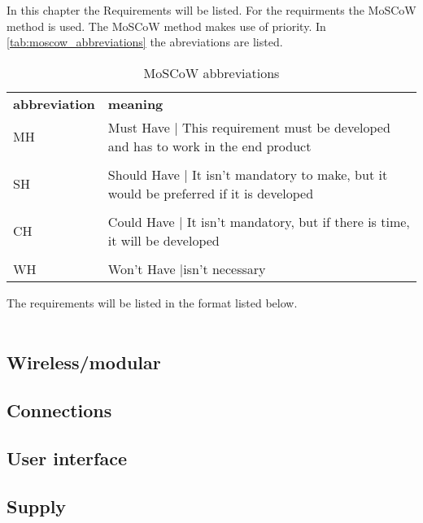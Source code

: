 In this chapter the Requirements will be listed. For the requirments the MoSCoW method is used. The MoSCoW method makes use of priority. In \autoref{tab:moscow_abbreviations} the abreviations are listed.

\begin{table}[H]
\centering
    \begin{tabular}{l p{8cm}}
        \textbf{abbreviation} & \textbf{meaning} \\
        MH & Must Have | This requirement must be developed and has to work in the end product\\
        & \\
        SH & Should Have | It isn't mandatory to make, but it would be preferred if it is developed\\
        & \\
        CH & Could Have | It isn't mandatory, but if there is time, it will be developed\\
        & \\
        WH & Won't Have |isn't necessary\\
    \end{tabular}
    \caption{MoSCoW abbreviations}
    \label{tab:moscow_abbreviations}
\end{table}

The requirements will be listed in the format listed below.\\

\\

\subsection{Wireless/modular}

\subsection{Connections}


\subsection{User interface}

\subsection{Supply}


